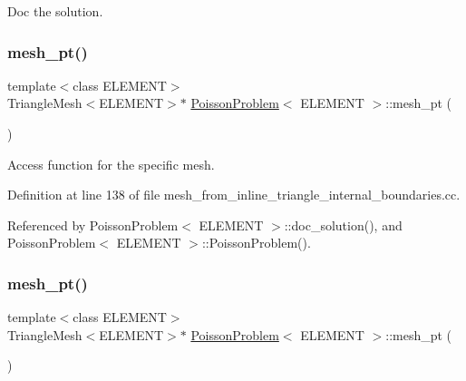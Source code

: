 Doc the solution. 

\mbox{\label{classPoissonProblem_ad428aa9392108f968db64534fc23ba86}} 
\subsubsection{\texorpdfstring{mesh\+\_\+pt()}{mesh\_pt()}\hspace{0.1cm}{\footnotesize\ttfamily [1/2]}}
{\footnotesize\ttfamily template$<$class E\+L\+E\+M\+E\+NT$>$ \\
Triangle\+Mesh$<$E\+L\+E\+M\+E\+NT$>$$\ast$ \hyperlink{classPoissonProblem}{Poisson\+Problem}$<$ E\+L\+E\+M\+E\+NT $>$\+::mesh\+\_\+pt (\begin{DoxyParamCaption}{ }\end{DoxyParamCaption})\hspace{0.3cm}{\ttfamily [inline]}}



Access function for the specific mesh. 



Definition at line 138 of file mesh\+\_\+from\+\_\+inline\+\_\+triangle\+\_\+internal\+\_\+boundaries.\+cc.



Referenced by Poisson\+Problem$<$ E\+L\+E\+M\+E\+N\+T $>$\+::doc\+\_\+solution(), and Poisson\+Problem$<$ E\+L\+E\+M\+E\+N\+T $>$\+::\+Poisson\+Problem().

\mbox{\label{classPoissonProblem_ad428aa9392108f968db64534fc23ba86}} 
\subsubsection{\texorpdfstring{mesh\+\_\+pt()}{mesh\_pt()}\hspace{0.1cm}{\footnotesize\ttfamily [2/2]}}
{\footnotesize\ttfamily template$<$class E\+L\+E\+M\+E\+NT$>$ \\
Triangle\+Mesh$<$E\+L\+E\+M\+E\+NT$>$$\ast$ \hyperlink{classPoissonProblem}{Poisson\+Problem}$<$ E\+L\+E\+M\+E\+NT $>$\+::mesh\+\_\+pt (\begin{DoxyParamCaption}{ }\end{DoxyParamCaption})\hspace{0.3cm}{\ttfamily [inline]}}




